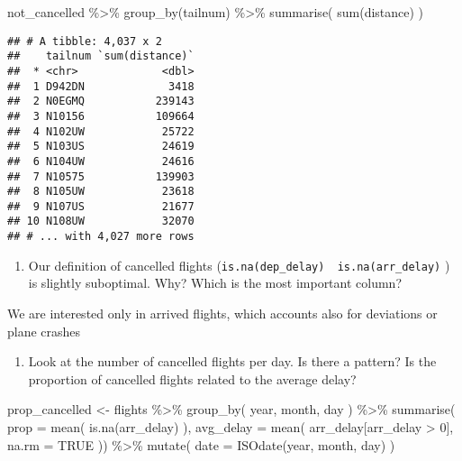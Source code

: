 \documentclass[
]{article}
\newenvironment{Shaded}{\begin{snugshade}}{\end{snugshade}}
\newcommand{\AttributeTok}[1]{\textcolor[rgb]{0.77,0.63,0.00}{#1}}
\newcommand{\ConstantTok}[1]{\textcolor[rgb]{0.00,0.00,0.00}{#1}}
\newcommand{\DecValTok}[1]{\textcolor[rgb]{0.00,0.00,0.81}{#1}}
\newcommand{\FunctionTok}[1]{\textcolor[rgb]{0.00,0.00,0.00}{#1}}
\newcommand{\NormalTok}[1]{#1}
\newcommand{\OtherTok}[1]{\textcolor[rgb]{0.56,0.35,0.01}{#1}}
\newcommand{\SpecialCharTok}[1]{\textcolor[rgb]{0.00,0.00,0.00}{#1}}
\providecommand{\tightlist}{%
  \setlength{\itemsep}{0pt}\setlength{\parskip}{0pt}}
\begin{document}
\begin{Shaded}
\begin{Highlighting}[]
\NormalTok{not\_cancelled }\SpecialCharTok{\%\textgreater{}\%} 
  \FunctionTok{group\_by}\NormalTok{(tailnum) }\SpecialCharTok{\%\textgreater{}\%} 
  \FunctionTok{summarise}\NormalTok{( }\FunctionTok{sum}\NormalTok{(distance) )}
\end{Highlighting}
\end{Shaded}

\begin{verbatim}
## # A tibble: 4,037 x 2
##    tailnum `sum(distance)`
##  * <chr>             <dbl>
##  1 D942DN             3418
##  2 N0EGMQ           239143
##  3 N10156           109664
##  4 N102UW            25722
##  5 N103US            24619
##  6 N104UW            24616
##  7 N10575           139903
##  8 N105UW            23618
##  9 N107US            21677
## 10 N108UW            32070
## # ... with 4,027 more rows
\end{verbatim}

\begin{enumerate}
\def\labelenumi{\arabic{enumi}.}
\tightlist
\item
  Our definition of cancelled flights
  (\texttt{is.na(dep\_delay)\ \textbar{}\ is.na(arr\_delay)} ) is
  slightly suboptimal. Why? Which is the most important column?
\end{enumerate}

We are interested only in arrived flights, which accounts also for
deviations or plane crashes

\begin{enumerate}
\def\labelenumi{\arabic{enumi}.}
\tightlist
\item
  Look at the number of cancelled flights per day. Is there a pattern?
  Is the proportion of cancelled flights related to the average delay?
\end{enumerate}

\begin{Shaded}
\begin{Highlighting}[]
\NormalTok{prop\_cancelled }\OtherTok{\textless{}{-}}\NormalTok{ flights }\SpecialCharTok{\%\textgreater{}\%} 
  \FunctionTok{group\_by}\NormalTok{( year, month, day ) }\SpecialCharTok{\%\textgreater{}\%} 
  \FunctionTok{summarise}\NormalTok{( }\AttributeTok{prop =} \FunctionTok{mean}\NormalTok{( }\FunctionTok{is.na}\NormalTok{(arr\_delay) ),}
             \AttributeTok{avg\_delay =} \FunctionTok{mean}\NormalTok{( arr\_delay[arr\_delay }\SpecialCharTok{\textgreater{}} \DecValTok{0}\NormalTok{], }\AttributeTok{na.rm =} \ConstantTok{TRUE}\NormalTok{ )) }\SpecialCharTok{\%\textgreater{}\%} 
  \FunctionTok{mutate}\NormalTok{( }\AttributeTok{date =} \FunctionTok{ISOdate}\NormalTok{(year, month, day) )}
\end{Highlighting}
\end{Shaded}
\end{document}
